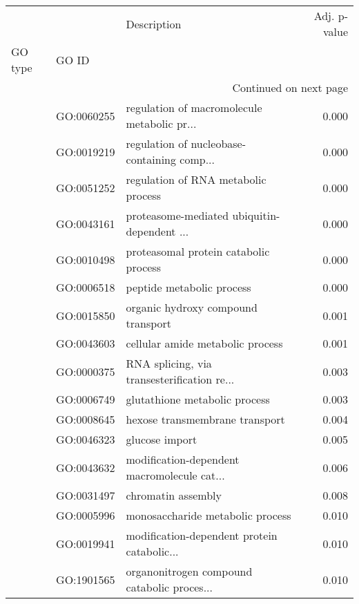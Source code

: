 \begin{longtable}{lllr}
\toprule
   &            &                                  Description &  Adj. p-value \\
GO type & GO ID &                                              &               \\
\midrule
\endhead
\midrule
\multicolumn{4}{r}{{Continued on next page}} \\
\midrule
\endfoot

\bottomrule
\endlastfoot
\multirow{47}{*}{BP} & GO:0060255 &  regulation of macromolecule metabolic pr... &         0.000 \\
   & GO:0019219 &  regulation of nucleobase-containing comp... &         0.000 \\
   & GO:0051252 &          regulation of RNA metabolic process &         0.000 \\
   & GO:0043161 &  proteasome-mediated ubiquitin-dependent ... &         0.000 \\
   & GO:0010498 &        proteasomal protein catabolic process &         0.000 \\
   & GO:0006518 &                    peptide metabolic process &         0.000 \\
   & GO:0015850 &           organic hydroxy compound transport &         0.001 \\
   & GO:0043603 &             cellular amide metabolic process &         0.001 \\
   & GO:0000375 &  RNA splicing, via transesterification re... &         0.003 \\
   & GO:0006749 &                glutathione metabolic process &         0.003 \\
   & GO:0008645 &               hexose transmembrane transport &         0.004 \\
   & GO:0046323 &                               glucose import &         0.005 \\
   & GO:0043632 &  modification-dependent macromolecule cat... &         0.006 \\
   & GO:0031497 &                           chromatin assembly &         0.008 \\
   & GO:0005996 &             monosaccharide metabolic process &         0.010 \\
   & GO:0019941 &  modification-dependent protein catabolic... &         0.010 \\
   & GO:1901565 &  organonitrogen compound catabolic proces... &         0.010 \\

\end{longtable}
